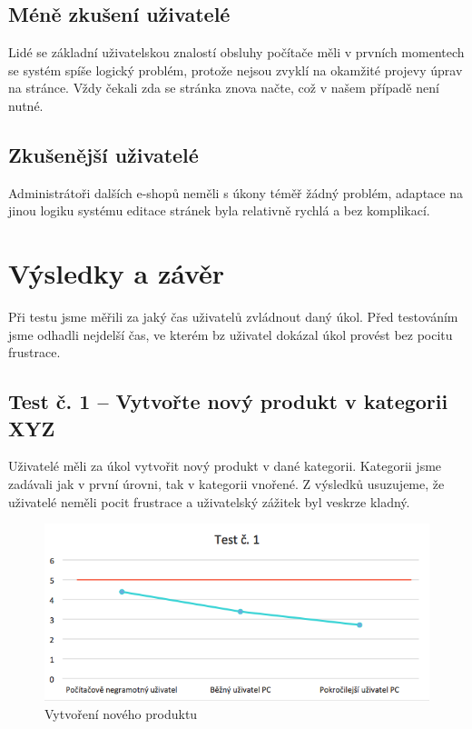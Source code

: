 \documentclass[11pt,a4paper]{article}
\begin{document}
\subsection*{Méně zkušení uživatelé}
Lidé se základní uživatelskou znalostí obsluhy počítače měli v prvních momentech se systém spíše logický problém, protože nejsou zvyklí na okamžité projevy úprav na stránce. Vždy čekali zda se stránka znova načte, což v našem případě není nutné.

\subsection*{Zkušenější uživatelé}
Administrátoři dalších e-shopů neměli s úkony téměř žádný problém, adaptace na jinou logiku systému editace stránek byla relativně rychlá a bez komplikací.

\section*{Výsledky a závěr}
Při testu jsme měřili za jaký čas uživatelů zvládnout daný úkol. Před testováním jsme odhadli nejdelší čas, ve kterém bz uživatel dokázal úkol provést bez pocitu frustrace.

\subsection*{Test č. 1 -- Vytvořte nový produkt v kategorii XYZ}
Uživatelé měli za úkol vytvořit nový produkt v dané kategorii. Kategorii jsme zadávali jak v první úrovni, tak v kategorii vnořené. Z výsledků usuzujeme, že uživatelé neměli pocit frustrace a uživatelský zážitek byl veskrze kladný.

\begin{figure}[ht]
    \centering
    \includegraphics[width=\textwidth]{t1.png}
    \caption{Vytvoření nového produktu}
\end{figure}
\end{document}
